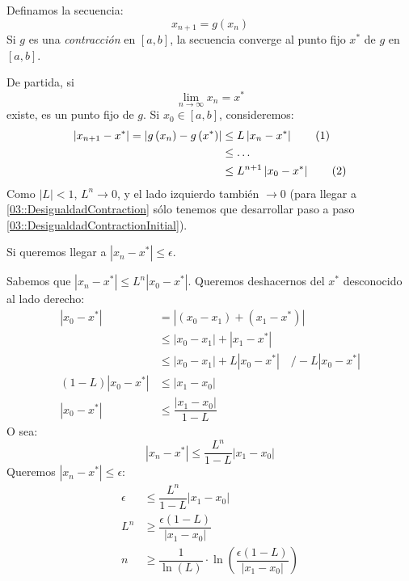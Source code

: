 \documentclass[english, spanish, fleqn, 10pt]{article}
\numberwithin{equation}{section}
\newcommand{\nparentesis}[1]{\left( #1 \right)}
\newcommand{\nabsoluto}[1]{\left| #1 \right|}
\newcommand{\ncorchetes}[1]{\left[ #1 \right]}
\theoremstyle{definition}
\newcommand\numberthis{\addtocounter{equation}{1}\tag{\theequation}}
\begin{document}
Definamos la secuencia:
\begin{equation}
x_{n+1}=g\nparentesis{x_n}
\end{equation}
Si $g$ es una \textit{contracción} en $\ncorchetes{a, b}$, la secuencia converge al punto fijo $x^*$ de $g$ en $\ncorchetes{a, b}$.

De partida, si
\begin{equation*}
\lim_{n\rightarrow \infty}x_n=x^*
\end{equation*}
existe, es un punto fijo de $g$. Si $x_0\in\ncorchetes{a, b}$, consideremos:
\begin{align*}
	\nabsoluto{x_{n+1}-x^*}=\nabsoluto{g\nparentesis{x_n}-g\nparentesis{x^*}}&\leq L\nabsoluto{x_n-x^*}\numberthis\label{03::DesigualdadContractionInitial}\\
	&\leq \ldots\\
	&\leq L^{n+1}\nabsoluto{x_0-x^*}\numberthis\label{03::DesigualdadContraction}
\end{align*}
Como $\nabsoluto{L} < 1$, $L^n\rightarrow 0$, y el lado izquierdo también $\rightarrow 0$ (para llegar a \eqref{03::DesigualdadContraction} sólo tenemos que desarrollar paso a paso \eqref{03::DesigualdadContractionInitial}).

Si queremos llegar a $\nabsoluto{x_n-x^*}\leq \epsilon$.

Sabemos que $\nabsoluto{x_n-x^*}\leq L^{n}\nabsoluto{x_0-x^*}$. Queremos deshacernos del $x^*$ desconocido al lado derecho:
\begin{align*}
	\nabsoluto{x_0-x^*}&=\nabsoluto{\nparentesis{x_0-x_1}+\nparentesis{x_1-x^*}}\\
	&\leq \nabsoluto{x_0-x_1}+\nabsoluto{x_1-x^*}\\
	&\leq \nabsoluto{x_0-x_1}+L\nabsoluto{x_0-x^*}\quad \Bigg / -L\nabsoluto{x_0-x^*}\\
	\nparentesis{1-L}\nabsoluto{x_0-x^*}&\leq \nabsoluto{x_1-x_0}\\
	\nabsoluto{x_0-x^*}&\leq \dfrac{\nabsoluto{x_1-x_0}}{1-L}
\end{align*}
O sea:
\begin{equation}
\nabsoluto{x_n-x^*}\leq \dfrac{L^n}{1-L}\nabsoluto{x_1-x_0}
\end{equation}
Queremos $\nabsoluto{x_n-x^*}\leq \epsilon$:
\begin{align*}
\epsilon&\leq \dfrac{L^n}{1-L}\nabsoluto{x_1-x_0}\\
L^n&\geq \dfrac{\epsilon\nparentesis{1-L}}{\nabsoluto{x_1-x_0}}\\
n&\geq \dfrac{1}{\ln\nparentesis{L}}\cdot \ln\nparentesis{\dfrac{\epsilon\nparentesis{1-L}}{\nabsoluto{x_1-x_0}}}
\end{align*}
\end{document}

